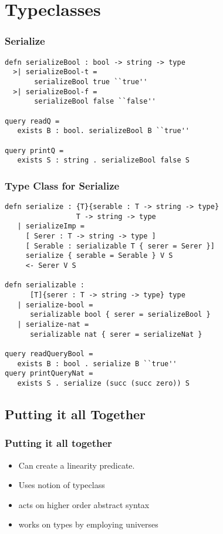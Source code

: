 \section{Typeclasses}
\begin{frame}[fragile]
\frametitle{Serialize}

\begin{lstlisting}
defn serializeBool : bool -> string -> type
  >| serializeBool-t = 
       serializeBool true ``true''
  >| serializeBool-f = 
       serializeBool false ``false''

query readQ = 
   exists B : bool. serializeBool B ``true''

query printQ = 
   exists S : string . serializeBool false S
\end{lstlisting}

\end{frame}

\begin{frame}[fragile]
\frametitle{Type Class for Serialize}

\begin{lstlisting}
defn serialize : {T}{serable : T -> string -> type} 
                 T -> string -> type
   | serializeImp = 
     [ Serer : T -> string -> type ]
     [ Serable : serializable T { serer = Serer }]
     serialize { serable = Serable } V S
     <- Serer V S

defn serializable : 
      [T]{serer : T -> string -> type} type
   | serialize-bool = 
      serializable bool { serer = serializeBool }
   | serialize-nat = 
      serializable nat { serer = serializeNat }

query readQueryBool = 
   exists B : bool . serialize B ``true''
query printQueryNat = 
   exists S . serialize (succ (succ zero)) S
\end{lstlisting}

\end{frame}


\subsection[Linearity]{Putting it all Together}

\begin{frame}
\frametitle{Putting it all together}
\begin{itemize}
\item Can create a linearity predicate.
\item Uses notion of typeclass
\item acts on higher order abstract syntax
\item works on types by employing universes
\end{itemize}
\end{frame}



